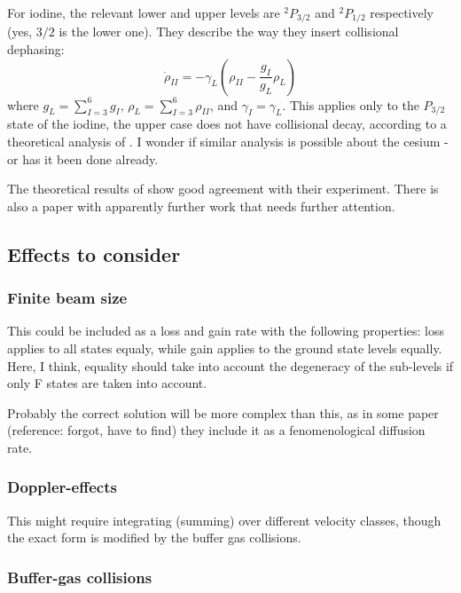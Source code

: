 \documentclass{article}
\begin{document}
\begin{spacing}{1.1}
For iodine, the relevant lower and upper levels are $^2P_{3/2}$ and $^2P_{1/2}$ respectively (yes, $3/2$ is the lower one). They describe the way they insert collisional dephasing:
\begin{equation}
\dot \rho_{II} = - \gamma_{L} \left(\rho_{II} - \frac{g_{I}}{g_{L}} \rho_{L}\right) 
\end{equation}
where $g_{L} = \sum_{I=3}^{6}g_{I}$, $\rho_{L}=\sum_{I=3}^{6} \rho_{II}$, and $\gamma_{I} = \gamma_{L}$. This applies only to the $P_{3/2}$ state of the iodine, the upper case does not have collisional decay, according to a theoretical analysis of \cite{Yukov1973}. I wonder if similar analysis is possible about the cesium - or has it been done already.

The theoretical results of \cite{Riley1979} show good agreement with their experiment. There is also a paper with apparently further work \cite{Uchiyama1982} that needs further attention.

 

\subsection{Effects to consider}

\subsubsection{Finite beam size}

This could be included as a loss and gain rate with the following properties: loss applies to all states equaly, while gain applies to the ground state levels equally. Here, I think, equality should take into account the degeneracy of the sub-levels if only F states are taken into account.

Probably the correct solution will be more complex than this, as in some paper (reference: forgot, have to find) they include it as a fenomenological diffusion rate.

\subsubsection{Doppler-effects}

This might require integrating (summing) over different velocity classes, though the exact form is modified by the buffer gas collisions.

\subsubsection{Buffer-gas collisions}


\end{spacing}
\end{document}
